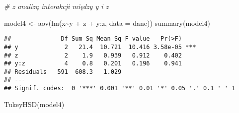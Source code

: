 \documentclass[
]{book}
\newenvironment{Shaded}{\begin{snugshade}}{\end{snugshade}}
\newcommand{\AttributeTok}[1]{\textcolor[rgb]{0.77,0.63,0.00}{#1}}
\newcommand{\CommentTok}[1]{\textcolor[rgb]{0.56,0.35,0.01}{\textit{#1}}}
\newcommand{\FunctionTok}[1]{\textcolor[rgb]{0.00,0.00,0.00}{#1}}
\newcommand{\NormalTok}[1]{#1}
\newcommand{\OtherTok}[1]{\textcolor[rgb]{0.56,0.35,0.01}{#1}}
\newcommand{\SpecialCharTok}[1]{\textcolor[rgb]{0.00,0.00,0.00}{#1}}
\begin{document}
\begin{Shaded}
\begin{Highlighting}[]
\CommentTok{\# z analizą interakcji między y i z}

\NormalTok{model4 }\OtherTok{\textless{}{-}} \FunctionTok{aov}\NormalTok{(}\FunctionTok{lm}\NormalTok{(x}\SpecialCharTok{\textasciitilde{}}\NormalTok{y }\SpecialCharTok{+}\NormalTok{ z }\SpecialCharTok{+}\NormalTok{ y}\SpecialCharTok{:}\NormalTok{z, }\AttributeTok{data =}\NormalTok{ dane))}
\FunctionTok{summary}\NormalTok{(model4)}
\end{Highlighting}
\end{Shaded}

\begin{verbatim}
##              Df Sum Sq Mean Sq F value   Pr(>F)    
## y             2   21.4  10.721  10.416 3.58e-05 ***
## z             2    1.9   0.939   0.912    0.402    
## y:z           4    0.8   0.201   0.196    0.941    
## Residuals   591  608.3   1.029                     
## ---
## Signif. codes:  0 '***' 0.001 '**' 0.01 '*' 0.05 '.' 0.1 ' ' 1
\end{verbatim}

\begin{Shaded}
\begin{Highlighting}[]
\FunctionTok{TukeyHSD}\NormalTok{(model4)}
\end{Highlighting}
\end{Shaded}
\end{document}
